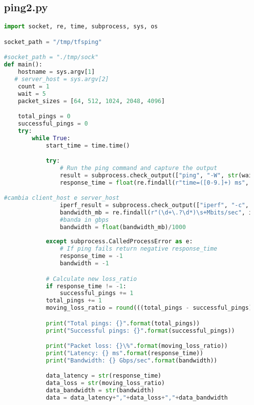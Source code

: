 \subsection{ping2.py}
\label{cap:pingcap}
\begin{lstlisting}[language=Python]
import socket, re, time, subprocess, sys, os

socket_path = "/tmp/tfsping"

#socket_path = "./tmp/sock"
def main():
    hostname = sys.argv[1]
   # server_host = sys.argv[2]
    count = 1
    wait = 5
    packet_sizes = [64, 512, 1024, 2048, 4096]

    total_pings = 0
    successful_pings = 0
    try:
        while True:
            start_time = time.time()

            try:
                # Run the ping command and capture the output
                result = subprocess.check_output(["ping", "-W", str(wait), "-c", str(count), hostname], universal_newlines=True)
                response_time = float(re.findall(r"time=([0-9.]+) ms", result)[0])

#cambia client_host e server_host
                iperf_result = subprocess.check_output(["iperf", "-c", hostname], universal_newlines=True)
                bandwidth_mb = re.findall(r"(\d+\.?\d*)\s+Mbits/sec", iperf_result)[-1]
                #banda in gbps
                bandwidth = float(bandwidth_mb)/1000
           
            except subprocess.CalledProcessError as e:
                # If ping fails return negative response_time
                response_time = -1
                bandwidth = -1

            # Calculate new loss_ratio
            if response_time != -1:
                successful_pings += 1
            total_pings += 1
            moving_loss_ratio = round(((total_pings - successful_pings) / float(total_pings) * 100), 2)

            print("Total pings: {}".format(total_pings))
            print("Successful pings: {}".format(successful_pings))

            print("Packet loss: {}\%".format(moving_loss_ratio))
            print("Latency: {} ms".format(response_time))
            print("Bandwidth: {} Gbps/sec".format(bandwidth))

            data_latency = str(response_time)
            data_loss = str(moving_loss_ratio)
            data_bandwidth = str(bandwidth)
            data = data_latency+","+data_loss+","+data_bandwidth


\end{lstlisting}
